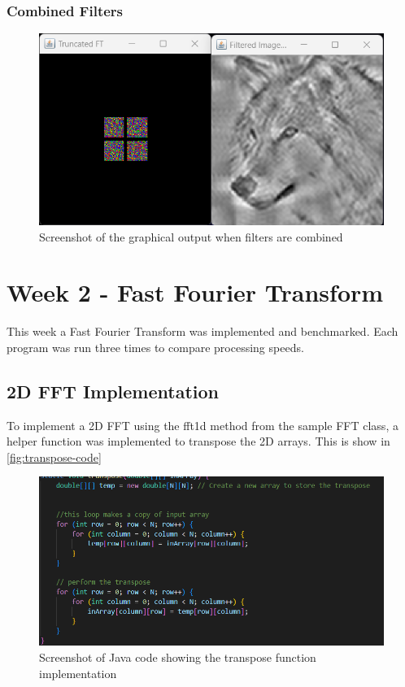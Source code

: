       \subsubsection{Combined Filters}
        \begin{figure}[H] 
            \centering
            \includegraphics[width=0.8\columnwidth]{Figures/Week 1/W1-Both-Filters.png}
            \caption{Screenshot of the graphical output when filters are combined}
            \label{fig:Combined-Filters}
        \end{figure}



\section{Week 2 - Fast Fourier Transform}
This week a Fast Fourier Transform was implemented and benchmarked. Each program was run three times to compare processing speeds. 

\subsection{2D FFT Implementation}
To implement a 2D FFT using the fft1d method from the sample FFT class, a helper function was implemented to transpose the 2D arrays. This is show in \autoref{fig:transpose-code} 

    \begin{figure}[H] 
        \centering
        \includegraphics[width=0.8\columnwidth]{Figures/Week 2/Transpose Implementation.png}
        \caption{Screenshot of Java code showing the transpose function implementation}
        \label{fig:transpose-code}
    \end{figure}

